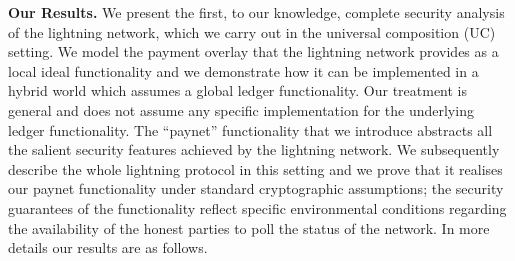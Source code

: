 \noindent \textbf{Our Results.} We present the first, to our knowledge, complete
security analysis of the lightning network, which we carry out in the
universal composition (UC) setting. We model the payment overlay that the
lightning network provides as a local ideal functionality and we demonstrate how it
can be implemented in a hybrid world which assumes a global ledger
functionality. Our treatment is general and does not assume any specific
implementation for the underlying ledger functionality. The ``paynet''
functionality that we introduce abstracts all the salient security features
achieved by the lightning network. We subsequently describe the whole lightning
protocol in this setting and we prove that it realises our paynet functionality
under standard cryptographic assumptions; the security guarantees of the
functionality reflect specific environmental conditions regarding the
availability of the honest parties to poll the status of the network. In more
details our results are as follows.

